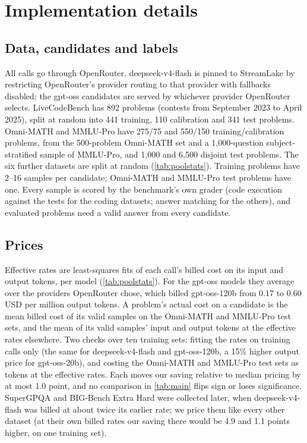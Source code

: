 \documentclass[10pt]{article}
\begin{document}
\FloatBarrier
\section{Implementation details}\label{app:protocol}
\subsection{Data, candidates and labels}
All calls go through OpenRouter. deepseek-v4-flash is pinned to StreamLake by restricting OpenRouter's provider routing to that provider with fallbacks disabled; the gpt-oss candidates are served by whichever provider OpenRouter selects. LiveCodeBench has 892 problems (contests from September 2023 to April 2025), split at random into 441 training, 110 calibration and 341 test problems. Omni-MATH and MMLU-Pro have 275/75 and 550/150 training/calibration problems, from the 500-problem Omni-MATH set and a 1,000-question subject-stratified sample of MMLU-Pro, and 1,000 and 6,500 disjoint test problems. The six further datasets are split at random (\cref{tab:poolstats}). Training problems have 2--16 samples per candidate; Omni-MATH and MMLU-Pro test problems have one. Every sample is scored by the benchmark's own grader (code execution against the tests for the coding datasets; answer matching for the others), and evaluated problems need a valid answer from every candidate.

\subsection{Prices}
Effective rates are least-squares fits of each call's billed cost on its input and output tokens, per model (\cref{tab:poolstats}). For the gpt-oss models they average over the providers OpenRouter chose, which billed gpt-oss-120b from 0.17 to 0.60 USD per million output tokens. A problem's actual cost on a candidate is the mean billed cost of its valid samples on the Omni-MATH and MMLU-Pro test sets, and the mean of its valid samples' input and output tokens at the effective rates elsewhere. Two checks over ten training sets: fitting the rates on training calls only (the same for deepseek-v4-flash and gpt-oss-120b, a 15\% higher output price for gpt-oss-20b), and costing the Omni-MATH and MMLU-Pro test sets as tokens at the effective rates. Each moves our saving relative to median pricing by at most 1.0 point, and no comparison in \cref{tab:main} flips sign or loses significance. SuperGPQA and BIG-Bench Extra Hard were collected later, when deepseek-v4-flash was billed at about twice its earlier rate; we price them like every other dataset (at their own billed rates our saving there would be 4.9 and 1.1 points higher, on one training set).
\end{document}
